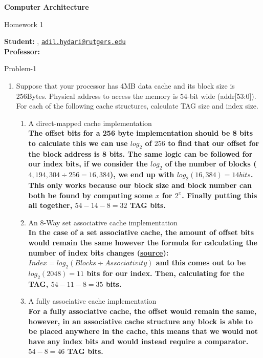 




	
	\begin{Large}
		\textsf{\textbf{Computer Architecture}}
		
		Homework 1
	\end{Large}
	
	\vspace{1ex}
	
	\textsf{\textbf{Student:}} , \href{mailto:adil.hydari@rutgers.edu}{\texttt{adil.hydari@rutgers.edu}}\\
	\textsf{\textbf{Professor:}} 
	
	
	\vspace{2ex}
	
	\begin{problem}{}{Problem-1}
		\begin{enumerate}
			\item Suppose that your processor has 4MB data cache and its block size is 256Bytes. Physical address to access the memory is 54-bit wide (addr[53:0]). For each of the following cache structures, calculate TAG size and index size.
			\begin{enumerate}[label=(\alph*)]
				\item A direct-mapped cache implementation\\
				\textbf{The offset bits for a 256 byte implementation should be 8 bits to calculate this we can use $log_2$ of $256$ to find that our offset for the block address is 8 bits. The same logic can be followed for our index bits, if we consider the $log_2$ of  the number of blocks ($4,194,304 \div 256 = 16,384$), we end up with $log_2(16,384)  = 14 bits$. This only works because our block size and block number can both be found by computing some $x$ for $2^x$. Finally putting this all together, $54-14-8 = 32$ TAG bits.}
				\item An 8-Way set associative cache implementation\\
				\textbf{In the case of a set associative cache, the amount of offset bits would remain the same however the formula for calculating the number of  index bits changes (\href{https://stackoverflow.com/questions/53620806/cache-block-tag-size}{source}): $Index = log_2(Blocks \div Associativity)$ and this comes out to be $log_2(2048) = 11$ bits for our index. Then, calculating for the TAG, $54-11-8 = 35$ bits. }
				\item A fully associative cache implementation\\
				\textbf{For a fully associative cache, the offset would remain the same, however, in an associative cache structure any block is able to be placed anywhere in the cache, this means that we would not have any index bits and would instead require a comparator. $54-8 = 46$ TAG bits.}
			\end{enumerate}
		\end{enumerate}
		
	\end{problem}	
	
